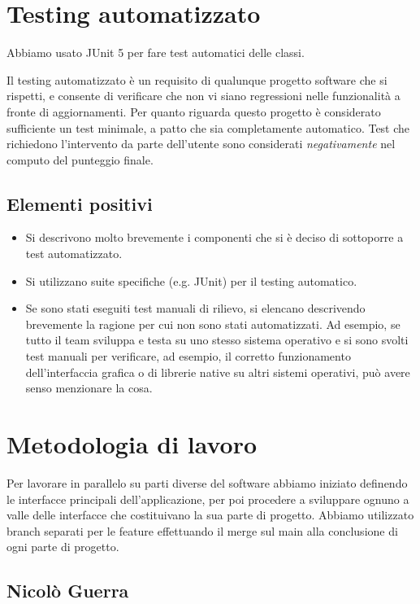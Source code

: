 \documentclass[a4paper,12pt]{report}
\begin{document}
\section{Testing automatizzato}

Abbiamo usato JUnit 5 per fare test automatici delle classi.

Il testing automatizzato è un requisito di qualunque progetto software che si rispetti, e consente di verificare che non vi siano regressioni nelle funzionalità a fronte di aggiornamenti.
%
Per quanto riguarda questo progetto è considerato sufficiente un test minimale, a patto che sia completamente automatico.
%
Test che richiedono l'intervento da parte dell'utente sono considerati \textit{negativamente} nel computo del punteggio finale.

\subsection*{Elementi positivi}

\begin{itemize}
	\item Si descrivono molto brevemente i componenti che si è deciso di sottoporre a test automatizzato.
	\item Si utilizzano suite specifiche (e.g. JUnit) per il testing automatico.
	\item Se sono stati eseguiti test manuali di rilievo, si elencano descrivendo brevemente la ragione per cui non sono stati automatizzati. Ad esempio, se tutto il team sviluppa e testa su uno stesso sistema operativo e si sono svolti test manuali per verificare, ad esempio, il corretto funzionamento dell'interfaccia grafica o di librerie native su altri sistemi operativi, può avere senso menzionare la cosa.
\end{itemize}

\section{Metodologia di lavoro}

Per lavorare in parallelo su parti diverse del software abbiamo iniziato definendo le interfacce principali dell'applicazione, per poi procedere a sviluppare ognuno a valle delle interfacce che costituivano la sua
parte di progetto. Abbiamo utilizzato branch separati per le feature effettuando il merge sul main alla conclusione di ogni parte di progetto.

\subsection{Nicolò Guerra}
\end{document}

